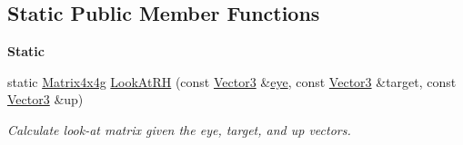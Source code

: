 \subsection*{Static Public Member Functions}
\begin{Indent}\textbf{ Static}\par
\begin{DoxyCompactItemize}
\item 
static \mbox{\hyperlink{classrev_1_1_square_matrix}{Matrix4x4g}} \mbox{\hyperlink{classrev_1_1_camera_ad9413f1b412112c657cb6e58f7fed60f}{Look\+At\+RH}} (const \mbox{\hyperlink{classrev_1_1_vector}{Vector3}} \&\mbox{\hyperlink{classrev_1_1_camera_af3be583f0c817c5251bae6c5617b41f8}{eye}}, const \mbox{\hyperlink{classrev_1_1_vector}{Vector3}} \&target, const \mbox{\hyperlink{classrev_1_1_vector}{Vector3}} \&up)
\begin{DoxyCompactList}\small\item\em Calculate look-\/at matrix given the eye, target, and up vectors. \end{DoxyCompactList}\end{DoxyCompactItemize}
\end{Indent}
